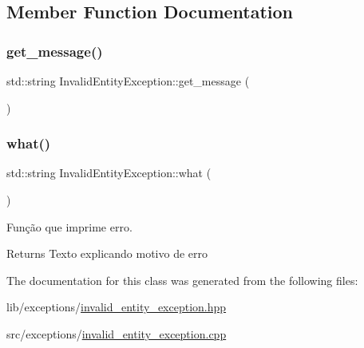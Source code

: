 \subsection{Member Function Documentation}
\mbox{\label{class_invalid_entity_exception_a765c42ad480c5c8714761f254e86fadd}} 
\subsubsection{\texorpdfstring{get\+\_\+message()}{get\_message()}}
{\footnotesize\ttfamily std\+::string Invalid\+Entity\+Exception\+::get\+\_\+message (\begin{DoxyParamCaption}{ }\end{DoxyParamCaption})}

\mbox{\label{class_invalid_entity_exception_ad07a831eba2b91b23a316b02ff162320}} 
\subsubsection{\texorpdfstring{what()}{what()}}
{\footnotesize\ttfamily std\+::string Invalid\+Entity\+Exception\+::what (\begin{DoxyParamCaption}{ }\end{DoxyParamCaption})}

Função que imprime erro. \begin{DoxyReturn}{Returns}
Texto explicando motivo de erro 
\end{DoxyReturn}


The documentation for this class was generated from the following files\+:\begin{DoxyCompactItemize}
\item 
lib/exceptions/\hyperlink{invalid__entity__exception_8hpp}{invalid\+\_\+entity\+\_\+exception.\+hpp}\item 
src/exceptions/\hyperlink{invalid__entity__exception_8cpp}{invalid\+\_\+entity\+\_\+exception.\+cpp}\end{DoxyCompactItemize}
